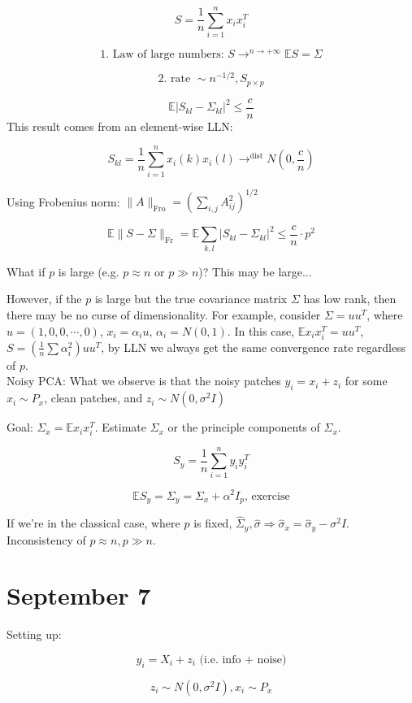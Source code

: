 \documentclass[12pt]{article}
\theoremstyle{plain}
\begin{document}
$$ S = \frac{1}{n} \sum_{i=1}^n x_i x_i^T $$

$$ \text{1. Law of large numbers: }S \rightarrow^{n\rightarrow + \infty} \mathbb{E}S = \Sigma$$

$$ \text{2. rate } \sim n^{-1/2}, S_{p \times p} $$

$$ \mathbb{E} | S_{kl} - \Sigma_{kl}|^2 \leq \frac{c}{n} $$
This result comes from an element-wise LLN:

$$ S_{kl} = \frac{1}{n} \sum_{i=1}^n x_i(k) x_i(l)  \rightarrow^\text{dist} N(0, \frac{c}{n})$$

Using Frobenius norm: $\| A \|_\text{Fro} = (\sum_{i,j} A_{ij}^2)^{1/2}$

$$ \mathbb{E} \| S-\Sigma \|_\text{Fr} = \mathbb{E} \sum_{k,l} |S_{kl} - \Sigma_{kl} |^2 \leq \frac{c}{n} \cdot p^2$$

What if $p$ is large (e.g. $p \approx n$ or $p \gg n$)? This may be large...

However, if the $p$ is large but the true covariance matrix $\Sigma$ has low rank, then there may be no curse of dimensionality. For example, consider
$\Sigma = uu^T$, where $u = (1,0,0,\cdots,0)$, $x_i = \alpha_i u$, $\alpha_i = N(0,1)$. In this case, $\mathbb{E}x_i x_i^T = uu^T$, $S = (\frac{1}{n}\sum \alpha_i^2)uu^T$, by LLN we always get the same convergence rate regardless of $p$.\\
Noisy PCA: What we observe is that the noisy patches $y_i = x_i + z_i$ for some $x_i \sim P_x$, clean patches, and $z_i \sim N(0, \sigma^2I)$

Goal: $\Sigma_x = \mathbb{E}x_i x_i^T$. Estimate $\Sigma_x$ or the principle components of $\Sigma_x$.

$$ S_y = \frac{1}{n} \sum_{i=1}^n y_i y_i^T$$

$$ \mathbb{E}S_y = \Sigma_y = \Sigma_x + \alpha^2 I_p \text{, exercise} $$

If we're in the classical case, where $p$ is fixed, $\hat{\Sigma}_y, \hat{\sigma} \Rightarrow \hat{\sigma}_x = \hat{\sigma}_y - \sigma^2 I$. Inconsistency of $p \approx n, p \gg n$.

\part*{September 7}

Setting up:

$$ y_i = X_i + z_i \text{ (i.e. info + noise)} $$

$$ z_i \sim N(0, \sigma^2I), x_i \sim P_x $$
\end{document}

